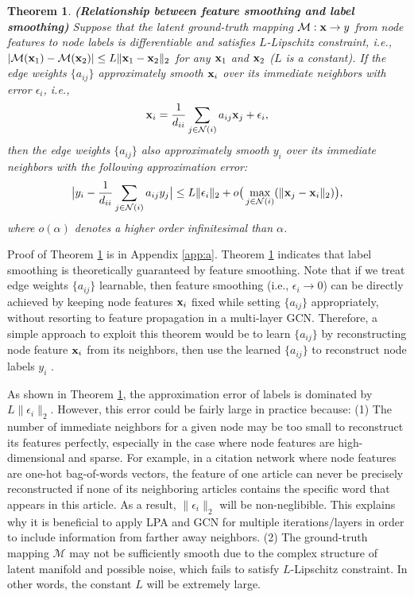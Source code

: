 \documentclass{article}
\newtheorem{theorem}{Theorem}
\begin{document}
		\begin{theorem}
		\label{thm:smoothing}
			\rm\textbf{(Relationship between feature smoothing and label smoothing)}
			Suppose that the latent ground-truth mapping $\mathcal M: {\bf x} \rightarrow y$ from node features to node labels is differentiable and satisfies $L$-Lipschitz constraint, i.e., $| \mathcal M({\bf x}_1) - \mathcal M({\bf x}_2) | \leq L \| {\bf x}_1 - {\bf x}_2 \|_2$ for any ${\bf x}_1$ and ${\bf x}_2$ ($L$ is a constant).
			If the edge weights $\{a_{ij}\}$ approximately smooth ${\bf x}_i$ over its immediate neighbors with error $\epsilon_i$, i.e.,
			\begin{equation}
				{\bf x}_i = \frac{1}{d_{ii}} \sum_{j \in \mathcal N(i)} a_{ij} {\bf x}_j + \epsilon_i,
			\end{equation}
			then the edge weights $\{a_{ij}\}$ also approximately smooth $y_i$ over its immediate neighbors with the following approximation error:
			\begin{equation}
				\big| y_i - \frac{1}{d_{ii}} \sum_{j \in \mathcal N(i)} a_{ij} y_j \big| \leq L \| \epsilon_i\|_2 + o \big( \max_{j \in \mathcal N(i)} ( \| {\bf x}_j - {\bf x}_i \|_2 ) \big),
			\end{equation}
			where $o(\alpha)$ denotes a higher order infinitesimal than $\alpha$.
		\end{theorem}
		
		Proof of Theorem \ref{thm:smoothing} is in Appendix \ref{app:a}.
		Theorem \ref{thm:smoothing} indicates that label smoothing is theoretically guaranteed by feature smoothing.
		Note that if we treat edge weights $\{a_{ij}\}$ learnable, then feature smoothing (i.e., $\epsilon_i \rightarrow 0$) can be directly achieved by keeping node features ${\bf x}_i$ fixed while setting $\{a_{ij}\}$ appropriately, without resorting to feature propagation in a multi-layer GCN.
		Therefore, a simple approach to exploit this theorem would be to learn $\{a_{ij}\}$ by reconstructing node feature ${\bf x}_i$ from its neighbors, then use the learned $\{a_{ij}\}$ to reconstruct node labels $y_i$ \citep{karasuyama2013manifold}.


		As shown in Theorem \ref{thm:smoothing}, the approximation error of labels is dominated by $L \| \epsilon_i\|_2$.
		However, this error could be fairly large in practice because:
		(1) The number of immediate neighbors for a given node may be too small to reconstruct its features perfectly, especially in the case where node features are high-dimensional and sparse.
		For example, in a citation network where node features are one-hot bag-of-words vectors, the feature of one article can never be precisely reconstructed if none of its neighboring articles contains the specific word that appears in this article.
		As a result, $\| \epsilon_i\|_2$ will be non-neglibible.
		This explains why it is beneficial to apply LPA and GCN for multiple iterations/layers in order to include information from farther away neighbors.
		(2) The ground-truth mapping $\mathcal M$ may not be sufficiently smooth due to the complex structure of latent manifold and possible noise, which fails to satisfy $L$-Lipschitz constraint.
		In other words, the constant $L$ will be extremely large.
		
\end{document}
